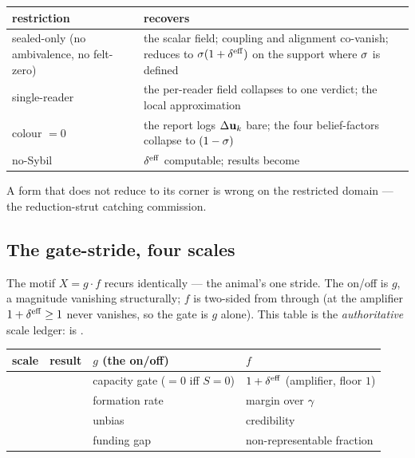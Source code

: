 \documentclass[../main]{subfiles}
\begin{document}
\begin{table}[htbp]
  \centering
  \begin{tabularx}{\textwidth}{@{} l L @{}}
    \toprule
    \textbf{restriction} & \textbf{recovers} \\
    \midrule
    sealed-only (no ambivalence, no felt-zero)
      & the scalar field; coupling and alignment co-vanish;  reduces to
        $\leanbare(1+\effdensity)$ on the support where $\sigma$ is defined \\
    \addlinespace
    single-reader & the per-reader field collapses to one verdict;  the local
      approximation \\
    \addlinespace
    colour $=0$ & the report logs $\Delta\mathbf{u}\sb{k}$ bare; the four belief-factors collapse to
      $(1-\sigma)$ \\
    \addlinespace
    no-Sybil & $\effdensity$ computable;  results become  \\
    \bottomrule
  \end{tabularx}
\end{table}

A form that does not reduce to its corner is wrong on the restricted domain --- the
reduction-strut catching commission.

\subsection{The gate-stride, four scales}
\label{subsec:corners:scales}
The motif $X=g\cdot f$ recurs identically --- the animal's one stride. The on/off is $g$, a
magnitude vanishing structurally; $f$ is two-sided from  through 
(at  the amplifier $1+\effdensity\ge1$ never vanishes, so the gate is $g$ alone).
This table is the \emph{authoritative} scale ledger:  is .

\begin{table}[htbp]
  \centering
  \begin{tabularx}{\textwidth}{@{} c l L L @{}}
    \toprule
    \textbf{scale} & \textbf{result} & \textbf{$g$ (the on/off)} & \textbf{$f$} \\
    \midrule
     & 
      & capacity gate ($=0$ iff $S{=}0$) & $1+\effdensity$ (amplifier, floor $1$) \\
    \addlinespace
     &  & formation rate & margin over $\gamma$ \\
    \addlinespace
     &  & unbias & credibility \\
    \addlinespace
     &  & funding gap & non-representable fraction \\
    \bottomrule
  \end{tabularx}
\end{table}
\end{document}
